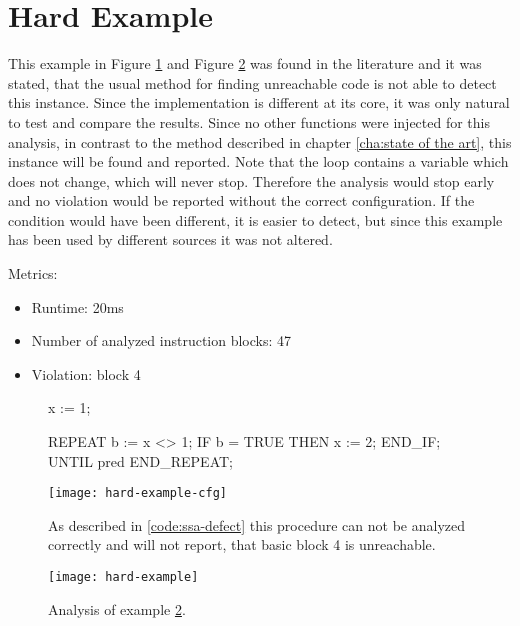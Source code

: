 \section{Hard Example}
This example in Figure \ref{code:hard example 1} and Figure \ref{code:hard example 1 cfg} was found in the literature \cite{Click_1995} and it was stated, that the usual method for finding unreachable code is not able to detect this instance. 
Since the implementation is different at its core, it was only natural to test and compare the results.
Since no other functions were injected for this analysis, in contrast to the method described in chapter \ref{cha:state of the art}, this instance will be found and reported.
Note that the loop contains a variable which does not change, which will never stop. Therefore the analysis would stop early and no violation would be reported without the correct configuration. 
If the condition would have been different, it is easier to detect, but since this example has been used by different sources it was not altered.


Metrics:
\begin{itemize}
	\item Runtime: 20ms
	\item Number of analyzed instruction blocks: 47
	\item Violation: block 4
\end{itemize}

\begin{figure}
	\begin{GenericCode}
x := 1;
	
REPEAT
	b := x <> 1;
	IF b = TRUE THEN
		x := 2;
	END_IF;    
UNTIL pred
END_REPEAT;	\end{GenericCode}
	\centering
	\texttt{[image: hard-example-cfg]}
	\caption{As described in \ref{code:ssa-defect} this procedure can not be analyzed correctly and will not report, that basic block 4 is unreachable. }
	\label{code:hard example 1}
\end{figure}
\begin{figure}
	\centering
	\texttt{[image: hard-example]}
	\caption{Analysis of example \ref{code:hard example 1 cfg}.}
	\label{code:hard example 1 cfg}
\end{figure}


